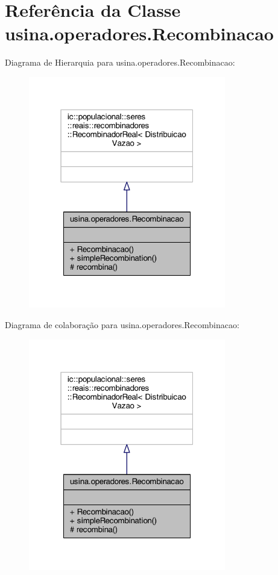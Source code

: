 \hypertarget{classusina_1_1operadores_1_1_recombinacao}{\section{Referência da Classe usina.\-operadores.\-Recombinacao}
\label{classusina_1_1operadores_1_1_recombinacao}
}


Diagrama de Hierarquia para usina.\-operadores.\-Recombinacao\-:
\nopagebreak
\begin{figure}[H]
\begin{center}
\leavevmode
\includegraphics[width=244pt]{classusina_1_1operadores_1_1_recombinacao__inherit__graph}
\end{center}
\end{figure}


Diagrama de colaboração para usina.\-operadores.\-Recombinacao\-:
\nopagebreak
\begin{figure}[H]
\begin{center}
\leavevmode
\includegraphics[width=244pt]{classusina_1_1operadores_1_1_recombinacao__coll__graph}
\end{center}
\end{figure}
